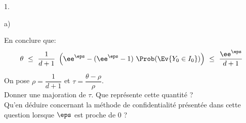 \begin{noliste}{1.}
\begin{noliste}{a)}
    
    
    
    
    

  \item En conclure que:
    \[
    \theta \ \leq \ \dfrac{1}{d+1} \ \left(\ee^{\eps} - (\ee^{\eps}-1)
      \ \Prob(\Ev{Y_0\in I_0}) \right) \ \leq \
    \dfrac{\ee^{\eps}}{d+1}
    \]

    

  \item On pose $\rho = \dfrac{1}{d+1}$ et $\tau = \dfrac{\theta -
      \rho}{\rho}$.\\
    Donner une majoration de $\tau$. Que représente cette quantité ?\\
    Qu'en déduire concernant la méthode de confidentialité présentée
    dans cette question lorsque $\eps$ est proche de $0$ ?

    
  \end{noliste}
\end{noliste}


\newpage


